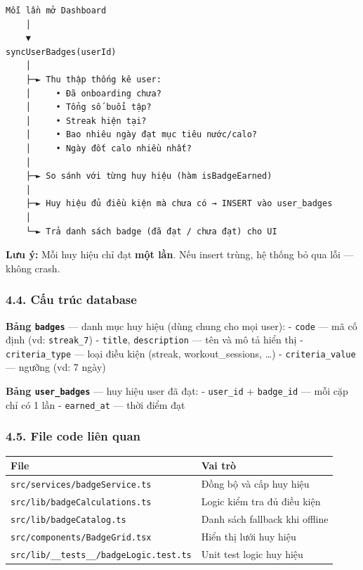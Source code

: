 \documentclass[12pt,a4paper]{article}
\begin{document}
\begin{verbatim}
Mỗi lần mở Dashboard
    │
    ▼
syncUserBadges(userId)
    │
    ├─► Thu thập thống kê user:
    │     • Đã onboarding chưa?
    │     • Tổng số buổi tập?
    │     • Streak hiện tại?
    │     • Bao nhiêu ngày đạt mục tiêu nước/calo?
    │     • Ngày đốt calo nhiều nhất?
    │
    ├─► So sánh với từng huy hiệu (hàm isBadgeEarned)
    │
    ├─► Huy hiệu đủ điều kiện mà chưa có → INSERT vào user_badges
    │
    └─► Trả danh sách badge (đã đạt / chưa đạt) cho UI
\end{verbatim}

\textbf{Lưu ý:} Mỗi huy hiệu chỉ đạt \textbf{một lần}. Nếu insert trùng,
hệ thống bỏ qua lỗi --- không crash.

\subsubsection{4.4. Cấu trúc database}\label{cux1ea5u-truxfac-database}

\textbf{Bảng \texttt{badges}} --- danh mục huy hiệu (dùng chung cho mọi
user): - \texttt{code} --- mã cố định (vd: \texttt{streak\_7}) -
\texttt{title}, \texttt{description} --- tên và mô tả hiển thị -
\texttt{criteria\_type} --- loại điều kiện (streak, workout\_sessions,
\ldots) - \texttt{criteria\_value} --- ngưỡng (vd: 7 ngày)

\textbf{Bảng \texttt{user\_badges}} --- huy hiệu user đã đạt: -
\texttt{user\_id} + \texttt{badge\_id} --- mỗi cặp chỉ có 1 lần -
\texttt{earned\_at} --- thời điểm đạt

\subsubsection{4.5. File code liên quan}\label{file-code-liuxean-quan-1}

{\def\LTcaptype{none} %
\begin{longtable}[]{@{}ll@{}}
\toprule\noalign{}
File & Vai trò \\
\midrule\noalign{}
\endhead
\bottomrule\noalign{}
\endlastfoot
\texttt{src/services/badgeService.ts} & Đồng bộ và cấp huy hiệu \\
\texttt{src/lib/badgeCalculations.ts} & Logic kiểm tra đủ điều kiện \\
\texttt{src/lib/badgeCatalog.ts} & Danh sách fallback khi offline \\
\texttt{src/components/BadgeGrid.tsx} & Hiển thị lưới huy hiệu \\
\texttt{src/lib/\_\_tests\_\_/badgeLogic.test.ts} & Unit test logic huy
hiệu \\
\end{longtable}
}
\end{document}
